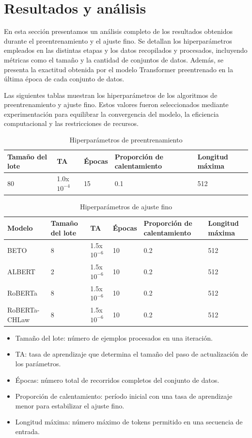 \chapter{Resultados y análisis}
\label{ch:resultados}

En esta sección presentamos un análisis completo de los resultados obtenidos durante el preentrenamiento y el ajuste fino. Se detallan los hiperparámetros empleados en las distintas etapas y los datos recopilados y procesados, incluyendo métricas como el tamaño y la cantidad de conjuntos de datos. Además, se presenta la exactitud obtenida por el modelo Transformer preentrenado en la última época de cada conjunto de datos.

Las siguientes tablas muestran los hiperparámetros de los algoritmos de preentrenamiento y ajuste fino. Estos valores fueron seleccionados mediante experimentación para equilibrar la convergencia del modelo, la eficiencia computacional y las restricciones de recursos.

\begin{table}[H]
\centering
\begin{tabular}{|l|l|l|l|l|}
\hline
Tamaño del lote & TA & Épocas & Proporción de calentamiento & Longitud máxima \\ \hline
80 & 1.0x$10^{-4}$ & 15 & 0.1 & 512 \\ \hline
\end{tabular}
\caption{Hiperparámetros de preentrenamiento}
\label{tab:Pre-Training HyperParameters}
\end{table}

\begin{table}[H]
\centering
\begin{tabular}{|l|l|l|l|l|l|}
\hline
Modelo & Tamaño del lote & TA & Épocas & Proporción de calentamiento & Longitud máxima \\ \hline
BETO & 8 & 1.5x$10^{-6}$ & 10 & 0.2 & 512 \\ \hline
ALBERT & 2 & 1.5x$10^{-6}$ & 10 & 0.2 & 512 \\ \hline
RoBERTa & 8 & 1.5x$10^{-6}$ & 10 & 0.2 & 512 \\ \hline
RoBERTa-CHLaw & 8 & 1.5x$10^{-6}$ & 10 & 0.2 & 512 \\ \hline
\end{tabular}
\caption{Hiperparámetros de ajuste fino}
\label{tab:Fine Tuning HyperParameters}
\end{table}

\begin{itemize}
   \item Tamaño del lote: número de ejemplos procesados en una iteración.
   \item TA: tasa de aprendizaje que determina el tamaño del paso de actualización de los parámetros.
   \item Épocas: número total de recorridos completos del conjunto de datos.
   \item Proporción de calentamiento: período inicial con una tasa de aprendizaje menor para estabilizar el ajuste fino.
   \item Longitud máxima: número máximo de tokens permitido en una secuencia de entrada.
\end{itemize}

